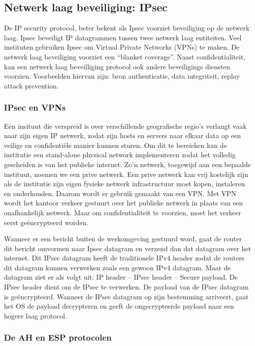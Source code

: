 \subsection{Netwerk laag beveiliging: IPsec}

De IP security protocol, beter bekent als Ipsec voorziet beveiliging op de netwerk laag. Ipsec beveiligt IP datagrammen tussen twee netwerk laag entiteiten. Veel instituten gebruiken Ipsec om Virtual Private Networks (VPNs) te maken.
De netwerk laag beveiliging voorziet een “blanket coverage”. Naast confidentialiteit, kan een netwerk laag beveilliging protocol ook andere beveiligings diensten voorzien. Voorbeelden hiervan zijn: bron authenticatie, data integriteit, replay attack prevention.

\subsubsection{IPsec en VPNs}

Een insituut die verspreid is over verschillende geografische regio’s verlangt vaak naar zijn eigen IP netwerk, zodat zijn hosts en servers naar elkaar data op een veilige en confidentiële manier kunnen sturen. Om dit te bereieken kan de institutie een stand-alone physical network implementeren zodat het volledig gescheiden is van het publieke internet. Zo’n netwerk, toegewijd aan een bepaalde instituut, noemen we een prive netwerk. Een prive netwerk kan vrij kostelijk zijn als de institutie zijn eigen fysieke netwerk infrastructuur moet kopen, instaleren en onderhouden.
Daarom wordt er gebruik gemaakt van een VPN. Met VPN wordt het kantoor verkeer gestuurt over het publieke netwerk in plaats van een onafhankelijk netwerk. Maar om confidentialiteit te voorzien, moet het verkeer eerst geëncrypteerd worden.

Wanneer er een bericht buiten de werkomgeving gestuurd word, gaat de router dit bericht omvormen naar Ipsec datagram en verzend dan dat datagram over het internet. Dit IPsec datagram heeft de traditionele IPv4 header zodat de routers dit datagram kunnen verwerken zoals een gewoon IPv4 datagram. Maar de datagram ziet er als volgt uit: IP header – IPsec header – Secure payload.
De IPsec header dient om de IPsec te verwerken. De payload van de IPsec datagram is geëncrypteerd. Wanneer de IPsec datagram op zijn bestemming arriveert, gaat het OS de payload decrypteren en geeft de ongecrypteerde payload naar een hogere laag protocol.

\subsubsection{De AH en ESP protocolen}

